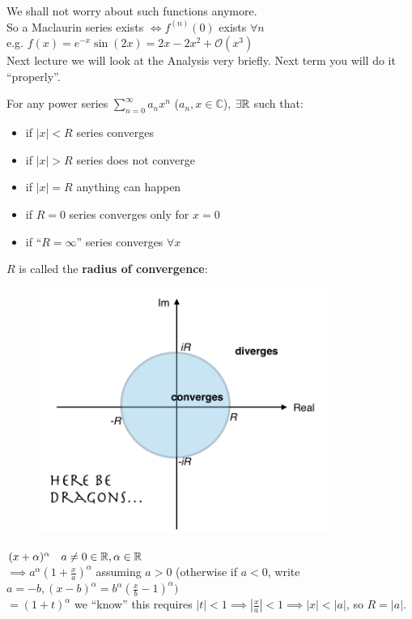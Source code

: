  We shall not worry about such functions anymore.\\
 
So a Maclaurin series exists $\iff f^{(n)}(0)$ exists $\forall n$\\

e.g. $f(x) = e^{-x}\sin(2x) = 2x - 2x^2 + \mathcal{O}(x^3)$\\



Next lecture we will look at the Analysis very briefly. Next term you will do it ``properly''.\\
\pagebreak
{}

For any power series $\displaystyle{\sum_{n=0}^{\infty} a_nx^n}$ ($a_n, x \in \mathbb{C}$), $\exists \mathbb{R}$ such that:

\begin{itemize}
\item if $|x| < R$ series converges
\item if $|x| > R$ series does not converge
\item if $|x| = R$ anything can happen
\item if $R = 0$ series converges only for $x = 0$
\item if ``$R = \infty$'' series converges $\forall x$
\end{itemize}

$R$ is called the \textbf{radius of convergence}:

\begin{figure}[!htb]
\centering
\includegraphics[height=8cm]{circle.png}
\label{fig:digraph}
\end{figure}


\begin{example}$(x+\alpha)^{\alpha} \quad a \neq 0 \in \mathbb{R}, \alpha \in \mathbb{R}$\\

$\implies a^{\alpha}(1 + \frac{x}{a})^{\alpha}$ assuming $a >0$ (otherwise if $a <0$, write $a=-b, (x-b)^{\alpha} = b^{\alpha}(\frac{x}{b} -1)^{\alpha})$\\

$= (1+t)^{\alpha}$ we ``know'' this requires $|t|<1 \implies |\frac{x}{a}| < 1 \implies |x| < |a|$, so $\boxed{R = |a|}$. \\\\ 
\end{example}

